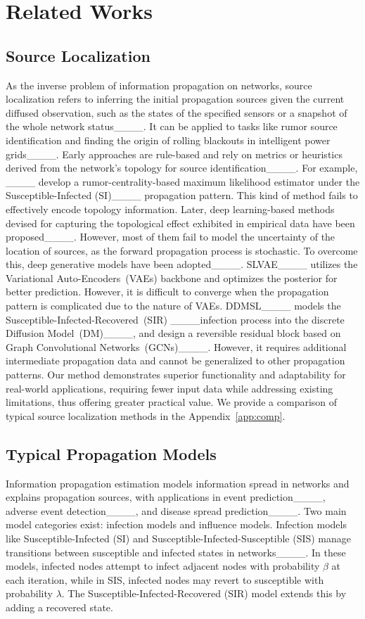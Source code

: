 \section{Related Works}
\label{r_w}
\subsection{Source Localization}
As the inverse problem of information propagation on networks, source localization refers to inferring the initial propagation sources given the current diffused observation, such as the states of the specified sensors or a snapshot of the whole network status____. It can be applied to tasks like rumor source identification and finding the origin of rolling blackouts in intelligent power grids____. Early approaches are rule-based and rely on metrics or heuristics derived from the network’s
topology for source identification____. For example, ____ develop a rumor-centrality-based maximum likelihood estimator under the Susceptible-Infected (SI)____ propagation pattern. This kind of method fails to effectively encode topology information. Later, deep learning-based methods devised for capturing the topological effect exhibited in
empirical data have been proposed____. However, most of them fail to model the uncertainty of the location of sources, as the forward propagation process is stochastic. To overcome this, deep generative models have been adopted____. SLVAE____ utilizes the Variational Auto-Encoders~(VAEs) backbone and optimizes the posterior for better prediction. However, it is difficult to converge when the propagation pattern is complicated due to the nature of VAEs. DDMSL____ models the Susceptible-Infected-Recovered~(SIR) ____infection process into the discrete Diffusion Model~(DM)____, and design a reversible residual block based on Graph Convolutional Networks~(GCNs)____. However, it requires additional intermediate propagation data and cannot be generalized to other propagation patterns. Our method demonstrates superior functionality and adaptability for real-world applications, requiring fewer input data while addressing existing limitations, thus offering greater practical value. {We provide a comparison of typical source localization methods in the Appendix~\ref{app:comp}.} 

\subsection{Typical Propagation Models}
Information propagation estimation models information spread in networks and explains propagation sources, with applications in event prediction____, adverse event detection____, and disease spread prediction____. Two main model categories exist: infection models and influence models. Infection models like Susceptible-Infected (SI) and Susceptible-Infected-Susceptible (SIS) manage transitions between susceptible and infected states in networks____. In these models, infected nodes attempt to infect adjacent nodes with probability $\beta$ at each iteration, while in SIS, infected nodes may revert to susceptible with probability $\lambda$. The Susceptible-Infected-Recovered (SIR) model extends this by adding a recovered state.

